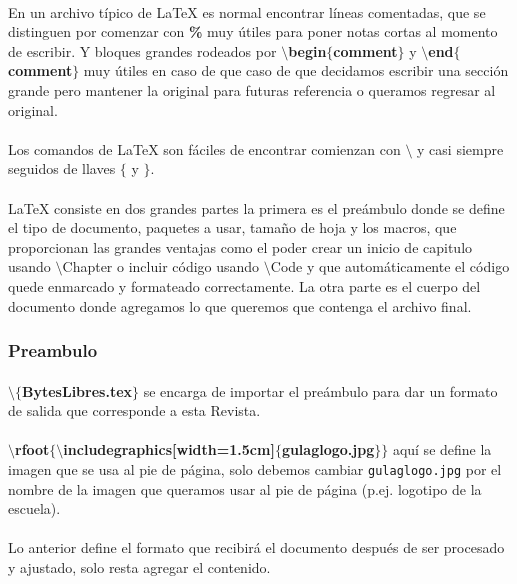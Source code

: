 \paragraph{} En un archivo típico de \LaTeX{} es normal encontrar líneas comentadas, que se distinguen por comenzar con \textbf{\%}
muy útiles para poner notas cortas al momento de escribir. Y bloques grandes rodeados por
\textbf{$\setminus$begin$\{$comment$\}$} y \textbf{$\setminus$end$\{$comment$\}$} muy útiles en caso de que caso de que
decidamos escribir una sección grande pero mantener la original para futuras referencia o queramos regresar al original.
\paragraph{} Los comandos de \LaTeX{} son fáciles de encontrar comienzan con \textbf{$\setminus$} y casi siempre seguidos de llaves \textbf{$\{$} y \textbf{$\}$}.

\paragraph{} \LaTeX{} consiste en dos grandes partes la primera es el preámbulo donde se define el tipo de documento, paquetes a usar, tamaño de hoja y los macros, que proporcionan las grandes ventajas como el poder crear un inicio de capitulo usando
$\setminus$Chapter o incluir código usando $\setminus$Code y que automáticamente el código quede enmarcado y formateado correctamente. La otra parte es el cuerpo del documento donde agregamos lo que queremos que contenga el archivo final.
\subsubsection*{Preambulo}
\paragraph{} \textbf{ $\setminus\{$BytesLibres.tex$\}$ }se encarga de importar el preámbulo para dar un formato de salida que corresponde a esta Revista.
\paragraph{} \textbf{ $\setminus$rfoot$\{\setminus$includegraphics[width=1.5cm]$\{$gulaglogo.jpg$\}\}$ }aquí se define la imagen que se usa al pie de página, solo debemos cambiar \texttt{gulaglogo.jpg} por el nombre de la imagen que queramos usar al pie de página (p.ej. logotipo de la escuela).
\paragraph{} Lo anterior define el formato que recibirá el documento después de ser procesado y ajustado, solo resta agregar el contenido.
